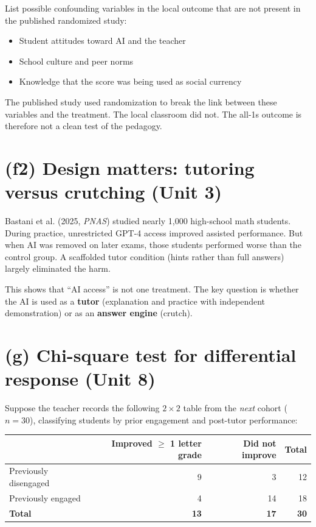 \documentclass[11pt]{article}
\begin{document}
List possible confounding variables in the local outcome that are not
present in the published randomized study:
\begin{itemize}[leftmargin=*]
  \item Student attitudes toward AI and the teacher
  \item School culture and peer norms
  \item Knowledge that the score was being used as social currency
\end{itemize}
The published study used randomization to break the link between
these variables and the treatment. The local classroom did not. The
all-1s outcome is therefore not a clean test of the pedagogy.

\section{(f2) Design matters: tutoring versus crutching \textnormal{\small(Unit 3)}}

Bastani et al. (2025, \emph{PNAS}) studied nearly 1,000 high-school
math students. During practice, unrestricted GPT-4 access improved
assisted performance. But when AI was removed on later exams, those
students performed worse than the control group. A scaffolded tutor
condition (hints rather than full answers) largely eliminated the harm.

This shows that ``AI access'' is not one treatment. The key question
is whether the AI is used as a \textbf{tutor} (explanation and practice
with independent demonstration) or as an \textbf{answer engine} (crutch).

\section{(g) Chi-square test for differential response \textnormal{\small(Unit 8)}}

Suppose the teacher records the following $2 \times 2$ table from the
\emph{next} cohort ($n = 30$), classifying students by prior
engagement and post-tutor performance:

\begin{center}
\small
\begin{tabular}{lrrr}
\toprule
 & Improved $\geq$ 1 letter grade & Did not improve & Total \\
\midrule
Previously disengaged & 9 & 3  & 12 \\
Previously engaged    & 4 & 14 & 18 \\
\midrule
\textbf{Total}        & \textbf{13} & \textbf{17} & \textbf{30} \\
\bottomrule
\end{tabular}
\end{center}
\end{document}
